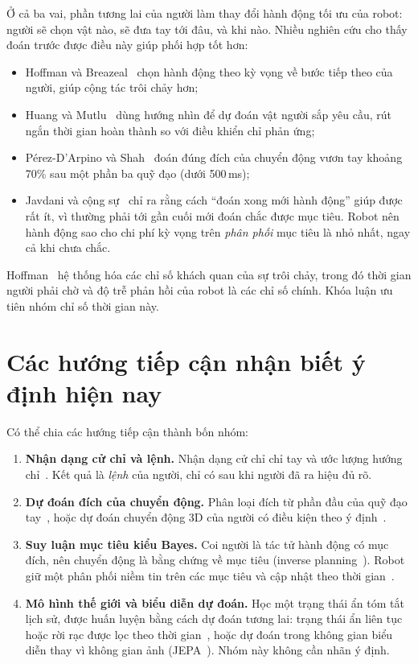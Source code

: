 Ở cả ba vai, phần tương lai của người làm thay đổi hành động tối ưu của robot: người sẽ chọn vật nào, sẽ đưa tay tới đâu, và khi nào. Nhiều nghiên cứu cho thấy đoán trước được điều này giúp phối hợp tốt hơn:
\begin{itemize}
  \item Hoffman và Breazeal~\cite{hoffman2007cost} chọn hành động theo kỳ vọng về bước tiếp theo của người, giúp cộng tác trôi chảy hơn;
  \item Huang và Mutlu~\cite{huang2016anticipatory} dùng hướng nhìn để dự đoán vật người sắp yêu cầu, rút ngắn thời gian hoàn thành so với điều khiển chỉ phản ứng;
  \item Pérez-D'Arpino và Shah~\cite{perezdarpino2015fast} đoán đúng đích của chuyển động vươn tay khoảng 70\% sau một phần ba quỹ đạo (dưới 500\,ms);
  \item Javdani và cộng sự~\cite{javdani2018shared} chỉ ra rằng cách ``đoán xong mới hành động'' giúp được rất ít, vì thường phải tới gần cuối mới đoán chắc được mục tiêu. Robot nên hành động sao cho chi phí kỳ vọng trên \emph{phân phối} mục tiêu là nhỏ nhất, ngay cả khi chưa chắc.
\end{itemize}
Hoffman~\cite{hoffman2019fluency} hệ thống hóa các chỉ số khách quan của sự trôi chảy, trong đó thời gian người phải chờ và độ trễ phản hồi của robot là các chỉ số chính. Khóa luận ưu tiên nhóm chỉ số thời gian này.

\section{Các hướng tiếp cận nhận biết ý định hiện nay}
\label{sec:intro-approaches}

Có thể chia các hướng tiếp cận thành bốn nhóm:
\begin{enumerate}
  \item \textbf{Nhận dạng cử chỉ và lệnh.} Nhận dạng cử chỉ chỉ tay và ước lượng hướng chỉ~\cite{nickel2007pointing,nakamura2023deepoint}. Kết quả là \emph{lệnh} của người, chỉ có sau khi người đã ra hiệu đủ rõ.
  \item \textbf{Dự đoán đích của chuyển động.} Phân loại đích từ phần đầu của quỹ đạo tay~\cite{perezdarpino2015fast}, hoặc dự đoán chuyển động 3D của người có điều kiện theo ý định~\cite{laplaza2022context}.
  \item \textbf{Suy luận mục tiêu kiểu Bayes.} Coi người là tác tử hành động có mục đích, nên chuyển động là bằng chứng về mục tiêu (inverse planning~\cite{baker2009inverse}). Robot giữ một phân phối niềm tin trên các mục tiêu và cập nhật theo thời gian~\cite{javdani2018shared}.
  \item \textbf{Mô hình thế giới và biểu diễn dự đoán.} Học một trạng thái ẩn tóm tắt lịch sử, được huấn luyện bằng cách dự đoán tương lai: trạng thái ẩn liên tục hoặc rời rạc được lọc theo thời gian~\cite{hafner2019planet,hafner2021dreamerv2}, hoặc dự đoán trong không gian biểu diễn thay vì không gian ảnh (JEPA~\cite{assran2023ijepa}). Nhóm này không cần nhãn ý định.
\end{enumerate}

